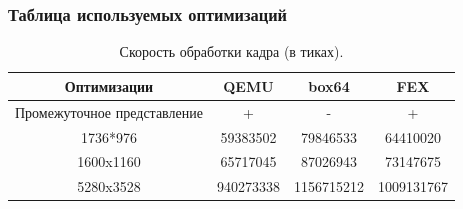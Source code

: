 \subsubsection{Таблица используемых оптимизаций}

\begin{table}[h]
	\begin{center}
		\label{tbl:small}
		\caption{Скорость обработки кадра (в тиках).}
			\begin{tabular}{|c|c|c|c|}
				\hline
				\bfseries Оптимизации & \bfseries QEMU & \bfseries box64 & \bfseries FEX  \\
				\hline
				Промежуточное представление & + & - & + \\ \hline
				1736*976 & 59383502 & 79846533 & 64410020 \\ \hline
				1600x1160 & 65717045 & 87026943 & 73147675 \\ \hline
				5280x3528 & 940273338 & 1156715212 & 1009131767 \\ \hline
		\end{tabular}
	\end{center}
\end{table}

